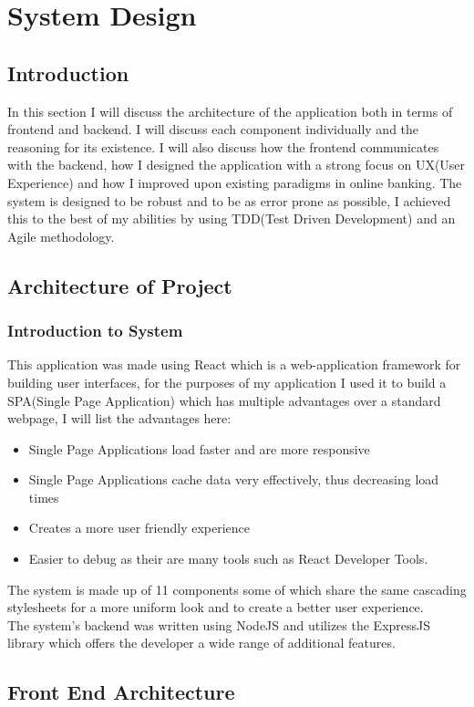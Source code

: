 \chapter{System Design}
\section{Introduction}
In this section I will discuss the architecture of the application both in terms of frontend and backend.
I will discuss each component individually and the reasoning for its existence.  I will also discuss how
the frontend communicates with the backend, how I designed the application with a strong focus on UX(User Experience)
and how I improved upon existing paradigms in online banking.  The system is designed to be robust and to be as
error prone as possible, I achieved this to the best of my abilities by using TDD(Test Driven Development) and an
Agile methodology.
\section{Architecture of Project}
\subsection{Introduction to System}
This application was made using React which is a web-application framework for building user interfaces,
for the purposes of my application I used it to build a SPA(Single Page Application) which has multiple
advantages over a standard webpage, I will list the advantages here:
\begin{itemize}
  \item Single Page Applications load faster and are more responsive
  \item Single Page Applications cache data very effectively, thus decreasing load times
  \item Creates a more user friendly experience
  \item Easier to debug as their are many tools such as React Developer Tools.
\end{itemize}
The system is made up of 11 components some of which share the same cascading stylesheets for
a more uniform look and to create a better user experience.
\\
The system's backend was written using NodeJS and utilizes the ExpressJS library
which offers the developer a wide range of additional features.
\section{Front End Architecture}
